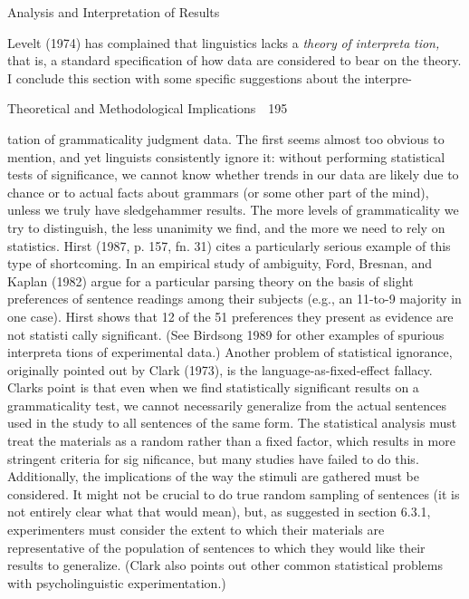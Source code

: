 \begin{styleHeadingviii}
Analysis and Interpretation of Results
\end{styleHeadingviii}


\begin{styleTextbody}
Levelt (1974) has complained that linguistics lacks a \textit{theory}\textit{ }\textit{of}\textit{ }\textit{interpreta\-}\textit{ }\textit{tion,}\textit{ }that is, a standard specification of how data are considered to bear on the theory. I conclude this section with some specific suggestions about the interpre-
\end{styleTextbody}


\clearpage\setcounter{page}{1}\begin{styleStandard}
Theoretical and Methodological Implications\ \ 195
\end{styleStandard}


\begin{styleTextbody}
tation of grammaticality judgment data. The first seems almost too obvious to mention, and yet linguists consistently ignore it: without performing statistical tests of significance, we cannot know whether trends in our data are likely due to chance or to actual facts about grammars (or some other part of the mind), unless we truly have sledgehammer results. The more levels of grammaticality we try to distinguish, the less unanimity we find, and the more we need to rely on statistics. Hirst (1987, p. 157, fn. 31) cites a particularly serious example of this type of shortcoming. In an empirical study of ambiguity, Ford, Bresnan, and Kaplan (1982) argue for a particular parsing theory on the basis of slight preferences of sentence readings among their subjects (e.g., an 11-to-9 majority in one case). Hirst shows that 12 of the 51 preferences they present as evidence are not statisti\- cally significant. (See Birdsong 1989 for other examples of spurious interpreta\- tions of experimental data.) Another problem of statistical ignorance, originally pointed out by Clark (1973), is the language-as-fixed-effect fallacy. Clark{\textquotesingle}s point is that even when we find statistically significant results on a grammaticality test, we cannot necessarily generalize from the actual sentences used in the study to all sentences of the same form. The statistical analysis must treat the materials as a random rather than a fixed factor, which results in more stringent criteria for sig\- nificance, but many studies have failed to do this. Additionally, the implications of the way the stimuli are gathered must be considered. It might not be crucial to do true random sampling of sentences (it is not entirely clear what that would mean), but, as suggested in section 6.3.1, experimenters must consider the extent to which their materials are representative of the population of sentences to which they would like their results to generalize. (Clark also points out other common statistical problems with psycholinguistic experimentation.)
\end{styleTextbody}


